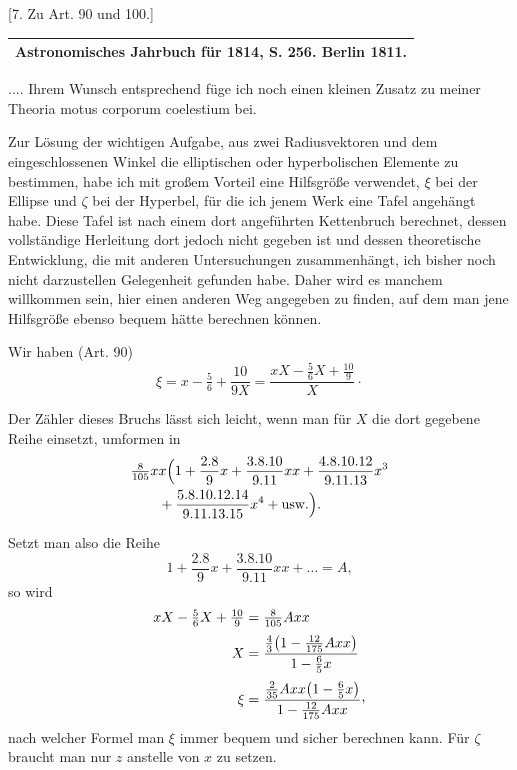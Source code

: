 \begin{center}
[7. Zu Art. 90 und 100.]
\end{center}
\begin{center}
\begin{tabular}{c}\hline
\small Astronomisches Jahrbuch für 1814, S. 256. Berlin 1811.\\\hline
\end{tabular}
\end{center}
.... Ihrem Wunsch entsprechend füge ich noch einen kleinen Zusatz zu meiner Theoria motus corporum coelestium bei.

Zur Lösung der wichtigen Aufgabe, aus zwei Radiusvektoren und dem eingeschlossenen Winkel die elliptischen oder hyperbolischen Elemente zu bestimmen, habe ich mit großem Vorteil eine Hilfsgröße verwendet, \(\xi\) bei der Ellipse und \(\zeta\) bei der Hyperbel, für die ich jenem Werk eine Tafel angehängt habe. Diese Tafel ist nach einem dort angeführten Kettenbruch berechnet, dessen vollständige Herleitung dort jedoch nicht gegeben ist und dessen theoretische Entwicklung, die mit anderen Untersuchungen zusammenhängt, ich bisher noch nicht darzustellen Gelegenheit gefunden habe. Daher wird es manchem willkommen sein, hier einen anderen Weg angegeben zu finden, auf dem man jene Hilfsgröße ebenso bequem hätte berechnen können.

Wir haben (Art. 90)
\[
\xi=x-\tfrac56+\frac{10}{9X}=\frac{xX-\tfrac56X+\tfrac{10}{9}}{X}\mathpunct{\cdot}
\]

Der Zähler dieses Bruchs lässt sich leicht, wenn man für \(X\) die dort gegebene Reihe einsetzt, umformen in
\[
\begin{aligned}
&\tfrac8{105}xx\Bigl(1+\frac{2.8}{9}x+\frac{3.8.10}{9.11}xx+\frac{4.8.10.12}{9.11.13}x^3\\
&\qquad+\frac{5.8.10.12.14}{9.11.13.15}x^4+\text{usw.}\Bigr).
\end{aligned}
\]

Setzt man also die Reihe
\[
1+\frac{2.8}{9}x+\frac{3.8.10}{9.11}xx+\ldots=A,
\]
so wird
\[
\begin{aligned}
xX-\tfrac56X+\tfrac{10}{9}&=\tfrac8{105}Axx\\[.5ex]
X&=\frac{\tfrac43\bigl(1-\tfrac{12}{175}Axx\bigr)}{1-\tfrac65x}\\[.5ex]
\xi&=\frac{\tfrac2{35}Axx\bigl(1-\tfrac65x\bigr)}{1-\tfrac{12}{175}Axx}\mathpunct{\raisebox{.45ex}{,}}
\end{aligned}
\]
nach welcher Formel man \(\xi\) immer bequem und sicher berechnen kann. Für \(\zeta\) braucht man nur \(z\) anstelle von \(x\) zu setzen.

